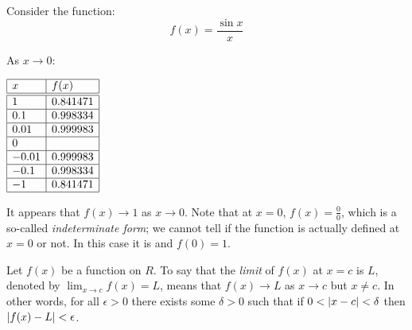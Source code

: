 \documentclass[letterpaper,12pt,fleqn]{article}
\newcommand{\e}{\epsilon}
\renewcommand{\d}{\delta}
\begin{document}
\begin{example}
  Consider the function:
  \[f(x)=\frac{\sin x}{x}\]

  \bigskip

  \begin{center}
  \end{center}

  As \(x\to0\):

  \begin{center}
    \(\begin{array}{|l|l|}
    \hline
    x & f(x) \\
    \hline
    \hline
    1 & 0.841471 \\
    \hline
    0.1 & 0.998334 \\
    \hline
    0.01 & 0.999983 \\
    \hline
    0 & \\
    \hline
    -0.01 & 0.999983 \\
    \hline
    -0.1 & 0.998334 \\
    \hline
    -1 & 0.841471 \\
    \hline
    \end{array}\)
  \end{center}

  \bigskip

  It appears that \(f(x)\to1\) as \(x\to0\).  Note that at \(x=0\), \(f(x)=\frac{0}{0}\), which is a so-called
  \emph{indeterminate form}; we cannot tell if the function is actually defined at \(x=0\) or not.  In this case
  it is and \(f(0)=1\).
\end{example}

\begin{definition}
  Let \(f(x)\) be a function on \(R\).  To say that the \emph{limit} of \(f(x)\) at \(x=c\) is \(L\), denoted by
  \(\displaystyle\lim_{x\to c}f(x)=L\), means that \(f(x)\to L\) as \(x\to c\) but \(x\ne c\).  In other words, for
  all \(\e>0\) there exists some \(\d>0\) such that if \(0<\abs{x-c}<\d\) then \(\abs{f(x)-L}<\e\).
\end{definition}
\end{document}
